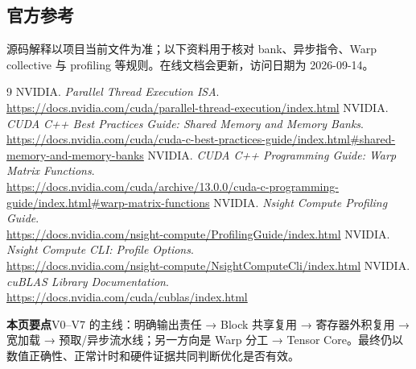 \documentclass[UTF8,11pt,a4paper,fontset=fandol]{ctexart}
\newcommand{\takeaway}[1]{\par\noindent\colorbox{PaleBlue}{\parbox{\dimexpr\linewidth-2\fboxsep\relax}{\textbf{本页要点}\quad #1}}\par}
\newcommand{\pagebreakhere}{\clearpage}
\begin{document}
\pagebreakhere
\subsection{官方参考}
源码解释以项目当前文件为准；以下资料用于核对 bank、异步指令、Warp collective 与 profiling 等规则。在线文档会更新，访问日期为 2026-09-14。
\begin{thebibliography}{9}
 NVIDIA. \textit{Parallel Thread Execution ISA}.\\
\url{https://docs.nvidia.com/cuda/parallel-thread-execution/index.html}
 NVIDIA. \textit{CUDA C++ Best Practices Guide: Shared Memory and Memory Banks}.\\
\url{https://docs.nvidia.com/cuda/cuda-c-best-practices-guide/index.html#shared-memory-and-memory-banks}
 NVIDIA. \textit{CUDA C++ Programming Guide: Warp Matrix Functions}.\\
\url{https://docs.nvidia.com/cuda/archive/13.0.0/cuda-c-programming-guide/index.html#warp-matrix-functions}
 NVIDIA. \textit{Nsight Compute Profiling Guide}.\\
\url{https://docs.nvidia.com/nsight-compute/ProfilingGuide/index.html}
 NVIDIA. \textit{Nsight Compute CLI: Profile Options}.\\
\url{https://docs.nvidia.com/nsight-compute/NsightComputeCli/index.html}
 NVIDIA. \textit{cuBLAS Library Documentation}.\\
\url{https://docs.nvidia.com/cuda/cublas/index.html}
\end{thebibliography}

\vspace{0.4cm}
\takeaway{V0--V7 的主线：明确输出责任 → Block 共享复用 → 寄存器外积复用 → 宽加载 → 预取/异步流水线；另一方向是 Warp 分工 → Tensor Core。最终仍以数值正确性、正常计时和硬件证据共同判断优化是否有效。}
\end{document}
